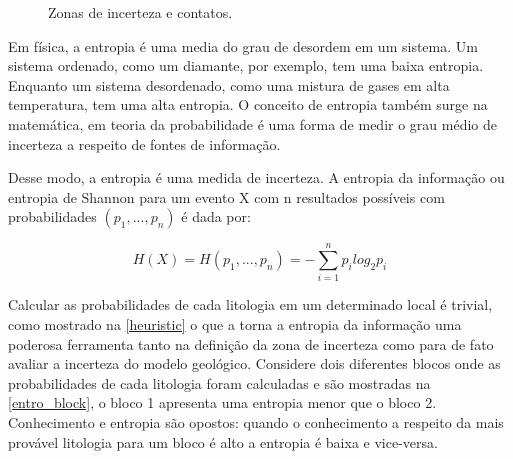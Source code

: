 \begin{figure}[H] 
	\caption{Zonas de incerteza e contatos.} \label{zonas}
	\centering
	\qquad
\end{figure}

Em física, a entropia é uma media do grau de desordem em um sistema. Um sistema ordenado, como um diamante, por exemplo, tem uma baixa entropia. Enquanto um sistema desordenado, como uma mistura de gases em alta temperatura, tem uma alta entropia. O conceito de entropia também surge na matemática, em teoria da probabilidade é uma forma de medir o grau médio de incerteza a respeito de fontes de informação.

Desse modo, a entropia é uma medida de incerteza. A entropia da informação ou entropia de Shannon \cite{shannon1948mathematical} para um evento X com n resultados possíveis com probabilidades $(p_1, ..., p_n)$ é dada por:

\begin{equation}
    H(X)=H(p_1, ..., p_n)=-\sum^n_{i=1}p_ilog_{2}p_i
\end{equation}

Calcular as probabilidades de cada litologia em um determinado local é trivial, como mostrado na \autoref{heuristic} o que a torna a entropia da informação uma poderosa ferramenta tanto na definição da zona de incerteza como para de fato avaliar a incerteza do modelo geológico. Considere dois diferentes blocos onde as probabilidades de cada litologia foram calculadas e são mostradas na \autoref{entro_block}, o bloco 1 apresenta uma entropia menor que o bloco 2. Conhecimento e entropia são opostos: quando o conhecimento a respeito da mais provável litologia para um bloco é alto a entropia é baixa e vice-versa. 

